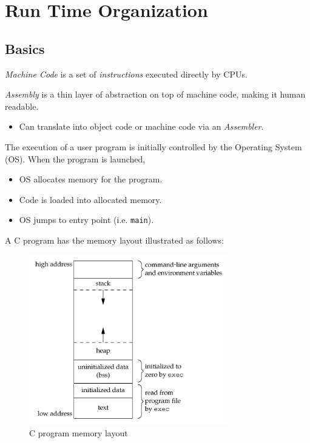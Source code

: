 \section{Run Time Organization}

\subsection{Basics}

\begin{definition}
    \textit{Machine Code} is a set of \textit{instructions} executed directly by CPUs.
\end{definition}

\begin{definition}
    \textit{Assembly} is a thin layer of abstraction on top of machine code, making it human readable.
    \begin{itemize}
        \item Can translate into object code or machine code via an \textit{Assembler}.
    \end{itemize}
\end{definition}

\begin{definition}
    The execution of a user program is initially controlled by the Operating System (OS). When the program is launched,
    \begin{itemize}
        \item OS allocates memory for the program.
        \item Code is loaded into allocated memory.
        \item OS jumps to entry point (i.e. \texttt{main}).
    \end{itemize}
\end{definition}

\begin{definition}
    A C program has the memory layout illustrated as follows:
    \begin{figure}[H]
        \centering
        \includegraphics[height=20em]{figures/c-memory-layout.png}
        \caption{C program memory layout \cite{clayout}}
        \label{fig:c-memory-layout}
    \end{figure}
\end{definition}


